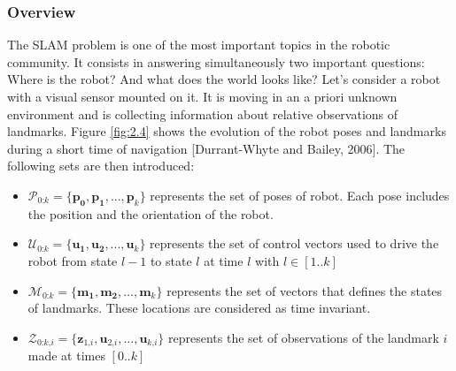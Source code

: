 \documentclass[11pt,openany]{book}
\begin{document}
\subsubsection{Overview}
The SLAM problem is one of the most important topics in the robotic community. It
consists in answering simultaneously two important questions: Where is the robot? And
what does the world looks like? Let’s consider a robot with a visual sensor mounted on
it. It is moving in an a priori unknown environment and is collecting information about
relative observations of landmarks. Figure \ref{fig:2.4} shows the evolution of the robot poses
and landmarks during a short time of navigation [Durrant-Whyte and Bailey, 2006]. The
following sets are then introduced:
\begin{itemize}
    \item $\mathcal{P_\textit{0:k}}=\{\mathbf{p_0},\mathbf{p_1},...,\mathbf{p_\textit{k}}\}$ represents the set of poses of robot. Each pose includes the position and the orientation of the robot.
    \item $\mathcal{U_\textit{0:k}}=\{\mathbf{u_1},\mathbf{u_2},...,\mathbf{u_\textit{k}}\}$ represents the set of control vectors used to drive the robot from state $\textit{l}-1$ to state $\textit{l}$ at time $\textit{l}$ with $\textit{l} \in [1..\textit{k}]$
    \item $\mathcal{M_\textit{0:k}}=\{\mathbf{m_1},\mathbf{m_2},...,\mathbf{m_\textit{k}}\}$ represents the set of vectors that defines the states of landmarks. These locations are considered as time invariant.
    \item $\mathcal{Z_\textit{0:k,i}}=\{\mathbf{z_\textit{1,i}},\mathbf{u_\textit{2,i}},...,\mathbf{u_\textit{k,i}}\}$ represents the set of observations of the landmark $\textit{i}$ made at times $[0..\textit{k}]$
\end{itemize}
\end{document}
